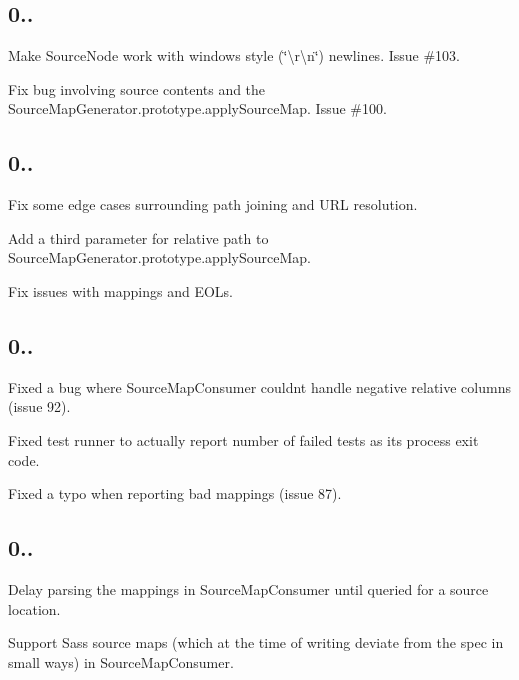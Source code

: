 \subsection*{0..}


\begin{DoxyItemize}
\item Make {\ttfamily Source\+Node} work with windows style (\char`\"{}\textbackslash{}r\textbackslash{}n\char`\"{}) newlines. Issue \#103.
\item Fix bug involving source contents and the {\ttfamily Source\+Map\+Generator.\+prototype.\+apply\+Source\+Map}. Issue \#100.
\end{DoxyItemize}

\subsection*{0..}


\begin{DoxyItemize}
\item Fix some edge cases surrounding path joining and U\+R\+L resolution.
\item Add a third parameter for relative path to {\ttfamily Source\+Map\+Generator.\+prototype.\+apply\+Source\+Map}.
\item Fix issues with mappings and E\+O\+Ls.
\end{DoxyItemize}

\subsection*{0..}


\begin{DoxyItemize}
\item Fixed a bug where Source\+Map\+Consumer couldn\textquotesingle{}t handle negative relative columns (issue 92).
\item Fixed test runner to actually report number of failed tests as its process exit code.
\item Fixed a typo when reporting bad mappings (issue 87).
\end{DoxyItemize}

\subsection*{0..}


\begin{DoxyItemize}
\item Delay parsing the mappings in Source\+Map\+Consumer until queried for a source location.
\item Support Sass source maps (which at the time of writing deviate from the spec in small ways) in Source\+Map\+Consumer.
\end{DoxyItemize}

